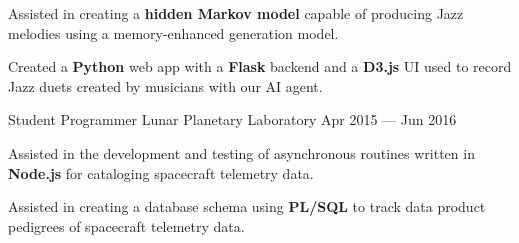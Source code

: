 \begin{cventries}
{      \begin{cvitems} %
        \item Assisted in creating a \textbf{hidden Markov model} capable of producing Jazz melodies using a memory-enhanced generation model.
        \item Created a \textbf{Python} web app with a \textbf{Flask} backend and a \textbf{D3.js} UI used to record Jazz duets created by musicians with our AI agent.
      \end{cvitems}
    }
    \vspace{.2cm}
  \cventry
    {Student Programmer} %
    {Lunar Planetary Laboratory} %
    {Apr 2015 --- Jun 2016} %
    {} %
    {
      \vspace{-0.1cm}
      \begin{cvitems} %
        \item Assisted in the development and testing of asynchronous routines written in \textbf{Node.js} for cataloging spacecraft telemetry data.
        \item Assisted in creating a database schema using \textbf{PL/SQL} to track data product pedigrees of spacecraft telemetry data.
      \end{cvitems}
    }

\end{cventries}
